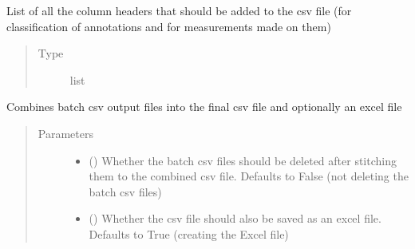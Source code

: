 \documentclass[letterpaper,10pt,english]{sphinxmanual}
\begin{document}
\begin{fulllineitems}

\begin{fulllineitems}
\label{\detokenize{index:stitch_MAPS_annotations.Stitcher.base_header}}
List of all the column headers that should be added to the csv file (for classification of
annotations and for measurements made on them)
\begin{quote}\begin{description}
\item[{Type}] \leavevmode
list

\end{description}\end{quote}

\end{fulllineitems}


\begin{fulllineitems}
\label{\detokenize{index:stitch_MAPS_annotations.Stitcher.combine_csvs}}
Combines batch csv output files into the final csv file and optionally an excel file
\begin{quote}\begin{description}
\item[{Parameters}] \leavevmode\begin{itemize}
\item {} 
 () \textendash{} Whether the batch csv files should be deleted after stitching them to the combined
csv file. Defaults to False (not deleting the batch csv files)

\item {} 
 () \textendash{} Whether the csv file should also be saved as an excel file. Defaults to True (creating the
Excel file)

\end{itemize}

\end{description}\end{quote}


\end{fulllineitems}
\end{fulllineitems}
\end{document}

